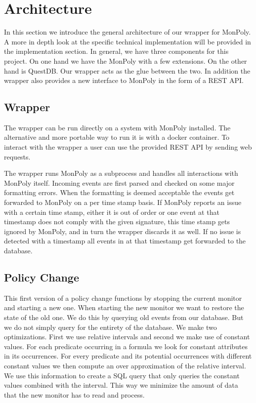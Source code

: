 \section{Architecture}

In this section we introduce the general architecture of our wrapper for MonPoly.
A more in depth look at the specific technical implementation will be provided in the implementation section.
In general, we have three components for this project.
On one hand we have the MonPoly with a few extensions.
On the other hand is QuestDB.
Our wrapper acts as the glue between the two.
In addition the wrapper also provides a new interface to MonPoly in the form of a REST API.

\subsection{Wrapper}

The wrapper can be run directly on a system with MonPoly installed.
The alternative and more portable way to run it is with a docker container.
To interact with the wrapper a user can use the provided REST API by sending web requests.

The wrapper runs MonPoly as a subprocess and handles all interactions with MonPoly itself.
Incoming events are first parsed and checked on some major formatting errors.
When the formatting is deemed acceptable the events get forwarded to MonPoly on a per time stamp basis.
If MonPoly reports an issue with a certain time stamp, either it is out of order or one event at that timestamp does not comply with the given signature, this time stamp gets ignored by MonPoly, and in turn the wrapper discards it as well.
If no issue is detected with a timestamp all events in at that timestamp get forwarded to the database.

\subsection{Policy Change}

This first version of a policy change functions by stopping the current monitor and starting a new one.
When starting the new monitor we want to restore the state of the old one.
We do this by querying old events from our database.
But we do not simply query for the entirety of the database.
We make two optimizations.
First we use relative intervals and second we make use of constant values.
For each predicate occurring in a formula we look for constant attributes in its occurrences.
For every predicate and its potential occurrences with different constant values we then compute an over approximation of the relative interval.
We use this information to create a SQL query that only queries the constant values combined with the interval.
This way we minimize the amount of data that the new monitor has to read and process.

